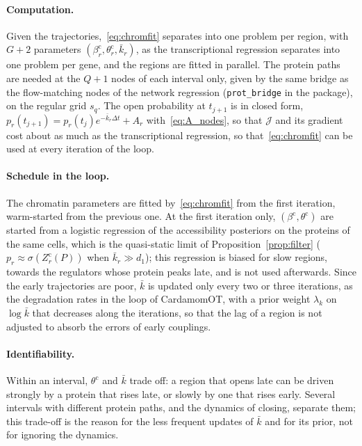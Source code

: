 \documentclass[a4paper, 11pt]{article}
\newcommand{\thc}{\theta^{\mathrm{c}}}
\newcommand{\bc}{\beta^{\mathrm{c}}}
\theoremstyle{plain}
\theoremstyle{remark}
\begin{document}
\paragraph{Computation.} Given the trajectories,~\eqref{eq:chromfit} separates into one problem per region, with $G + 2$ parameters $(\bc_r, \thc_r, \bar k_r)$, as the transcriptional regression separates into one problem per gene, and the regions are fitted in parallel. The protein paths are needed at the $Q + 1$ nodes of each interval only, given by the same bridge as the flow-matching nodes of the network regression (\texttt{prot\_bridge} in the package), on the regular grid $s_q$. The open probability at $t_{j+1}$ is in closed form, $p_r(t_{j+1}) = p_r(t_j)e^{-\bar k_r\Delta t} + A_r$ with~\eqref{eq:A_nodes}, so that $\mathcal{J}$ and its gradient cost about as much as the transcriptional regression, so that~\eqref{eq:chromfit} can be used at every iteration of the loop.

\paragraph{Schedule in the loop.} The chromatin parameters are fitted by~\eqref{eq:chromfit} from the first iteration, warm-started from the previous one. At the first iteration only, $(\bc, \thc)$ are started from a logistic regression of the accessibility posteriors on the proteins of the same cells, which is the quasi-static limit of Proposition~\ref{prop:filter} ($p_r \approx \sigma(Z^{\mathrm{c}}_r(P))$ when $\bar k_r \gg d_1$); this regression is biased for slow regions, towards the regulators whose protein peaks late, and is not used afterwards. Since the early trajectories are poor, $\bar k$ is updated only every two or three iterations, as the degradation rates in the loop of CardamomOT, with a prior weight $\lambda_k$ on $\log\bar k$ that decreases along the iterations, so that the lag of a region is not adjusted to absorb the errors of early couplings.

\paragraph{Identifiability.} Within an interval, $\thc$ and $\bar k$ trade off: a region that opens late can be driven strongly by a protein that rises late, or slowly by one that rises early. Several intervals with different protein paths, and the dynamics of closing, separate them; this trade-off is the reason for the less frequent updates of $\bar k$ and for its prior, not for ignoring the dynamics.
\end{document}
